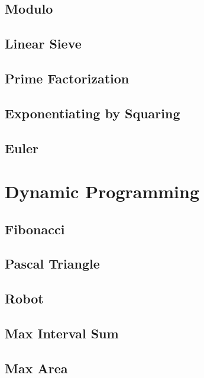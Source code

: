     \subsection{Modulo}
        
    \subsection{Linear Sieve}
        
    \subsection{Prime Factorization}
        
    \subsection{Exponentiating by Squaring}
        
    \subsection{Euler}
        

\section{Dynamic Programming}
    \subsection{Fibonacci}
            
    \subsection{Pascal Triangle}
        
    \subsection{Robot}
        
    \subsection{Max Interval Sum}
        
    \subsection{Max Area}
        
